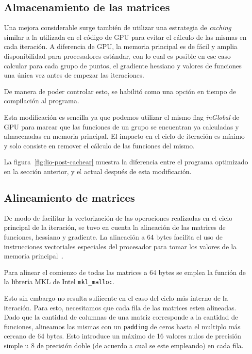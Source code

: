 \subsection{Almacenamiento de las matrices}

Una mejora considerable surge tambi\'en de utilizar una estrategia de \textit{caching}
similar a la utilizada en el c\'odigo de GPU para evitar el c\'alculo de las mismas
en cada iteraci\'on. A diferencia de GPU, la memoria principal es de f\'acil y
amplia disponibilidad para procesadores est\'andar, con lo cual es posible en ese
caso calcular para cada grupo de puntos, el gradiente hessiano y valores de 
funciones una \'unica vez antes de empezar las iteraciones.

De manera de poder controlar esto, se habilit\'o como una opci\'on en tiempo de
compilaci\'on al programa.

Esta modificaci\'on es sencilla ya que podemos utilizar el mismo flag 
\textit{inGlobal} de GPU para marcar que las funciones de un grupo se encuentran
ya calculadas y almacenadas en memoria principal. El impacto en el ciclo de 
iteraci\'on es m\'inimo y solo consiste en remover el c\'alculo de las funciones
del mismo.

La figura~\ref{fig:lio-post-cachear} muestra la diferencia entre el programa
optimizado en la secci\'on anterior, y el actual despu\'es de esta modificaci\'on.


\subsection{Alineamiento de matrices}

De modo de facilitar la vectorizaci\'on de las operaciones realizadas en el 
ciclo principal de la iteraci\'on, se tuvo en cuenta la alineaci\'on de las 
matrices de funciones, hessiano y gradiente. La alineaci\'on a 64 bytes facilita
el uso de instrucciones vectoriales especiales del procesador para tomar los 
valores de la memoria principal~\cite{AutovectorizationGuide}.

Para alinear el comienzo de todas las matrices a 64 bytes se emplea la funci\'on
de la librer\'ia MKL de Intel \texttt{mkl\_malloc}.

Esto sin embargo no resulta sufiicente en el caso del ciclo m\'as interno de
la iteraci\'on. Para esto, necesitamos que cada fila de las matrices esten alineadas.
Dado que la cantidad de columnas de una matriz corresponde a la cantidad de funciones,
alineamos las mismas con un \texttt{padding} de ceros hasta el multiplo m\'as 
cercano de 64 bytes. Esto introduce un m\'aximo de 16 valores nulos de precisi\'on 
simple u 8 de precisi\'on doble (de acuerdo a cual se este empleando) en cada
fila.

